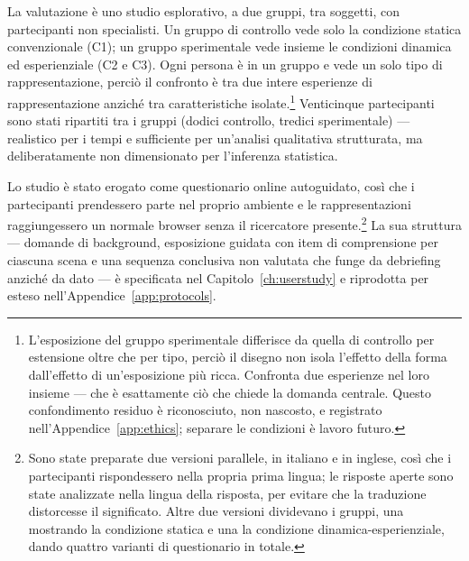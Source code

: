 La valutazione è uno studio esplorativo, a due gruppi, tra soggetti, con partecipanti non specialisti. Un gruppo di controllo vede solo la condizione statica convenzionale (C1); un gruppo sperimentale vede insieme le condizioni dinamica ed esperienziale (C2 e C3). Ogni persona è in un gruppo e vede un solo tipo di rappresentazione, perciò il confronto è tra due intere esperienze di rappresentazione anziché tra caratteristiche isolate.\footnote{L'esposizione del gruppo sperimentale differisce da quella di controllo per estensione oltre che per tipo, perciò il disegno non isola l'effetto della forma dall'effetto di un'esposizione più ricca. Confronta due esperienze nel loro insieme --- che è esattamente ciò che chiede la domanda centrale. Questo confondimento residuo è riconosciuto, non nascosto, e registrato nell'Appendice~\ref{app:ethics}; separare le condizioni è lavoro futuro.} Venticinque partecipanti sono stati ripartiti tra i gruppi (dodici controllo, tredici sperimentale) --- realistico per i tempi e sufficiente per un'analisi qualitativa strutturata, ma deliberatamente non dimensionato per l'inferenza statistica.

Lo studio è stato erogato come questionario online autoguidato, così che i partecipanti prendessero parte nel proprio ambiente e le rappresentazioni raggiungessero un normale browser senza il ricercatore presente.\footnote{Sono state preparate due versioni parallele, in italiano e in inglese, così che i partecipanti rispondessero nella propria prima lingua; le risposte aperte sono state analizzate nella lingua della risposta, per evitare che la traduzione distorcesse il significato. Altre due versioni dividevano i gruppi, una mostrando la condizione statica e una la condizione dinamica-esperienziale, dando quattro varianti di questionario in totale.} La sua struttura --- domande di background, esposizione guidata con item di comprensione per ciascuna scena e una sequenza conclusiva non valutata che funge da debriefing anziché da dato --- è specificata nel Capitolo~\ref{ch:userstudy} e riprodotta per esteso nell'Appendice~\ref{app:protocols}.

